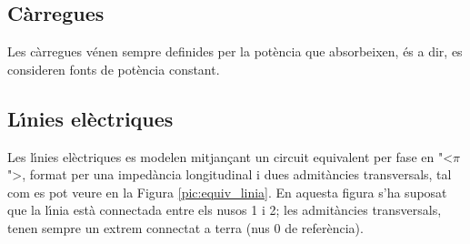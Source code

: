 \subsection{C\`{a}rregues}

Les c\`{a}rregues v\'{e}nen sempre definides per la pot\`{e}ncia que absorbeixen, \'{e}s a dir, es consideren fonts de pot\`{e}ncia constant.

\subsection{L\'{\i}nies el\`{e}ctriques} 

Les l\'{\i}nies el\`{e}ctriques es modelen mitjan\c{c}ant un circuit equivalent
per fase en {"<}$\pi${">}, format per una imped\`{a}ncia longitudinal i dues
admit\`{a}ncies transversals, tal com es pot veure en la Figura
\vref{pic:equiv_linia}. En aquesta figura s'ha suposat que la l\'{\i}nia
est\`{a} connectada entre els nusos 1 i 2; les admit\`{a}ncies transversals,
tenen sempre un extrem connectat a terra (nus 0 de refer\`{e}ncia).

